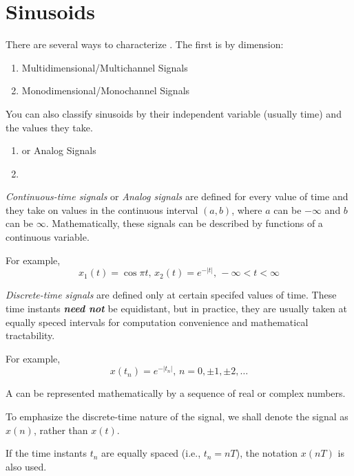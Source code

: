 \section{Sinusoids}\label{sec:Sinusoids}
There are several ways to characterize .
The first is by dimension:
\begin{enumerate}[noitemsep]
\item Multidimensional/Multichannel Signals
\item Monodimensional/Monochannel Signals
\end{enumerate}

You can also classify sinusoids by their independent variable (usually time) and the values they take.
\begin{enumerate}[noitemsep]
\item {} or Analog Signals
\item {}
\end{enumerate}

\begin{definition}\label{def:Continuous-Time Signals}
  \emph{Continuous-time signals} or \emph{Analog signals} are defined for every value of time and they take on values in the continuous interval $(a,b)$, where $a$ can be $-\infty$ and $b$ can be $\infty$.
  Mathematically, these signals can be described by functions of a continuous variable.

  For example,
  \begin{equation*}
    x_{1}(t) = \cos \pi t \text{, } x_{2}(t) = e^{-\lvert t \rvert} \text{, } -\infty < t < \infty
  \end{equation*}
\end{definition}

\begin{definition}\label{def:Discrete-Time Signals}
  \emph{Discrete-time signals} are defined only at certain specifed values of time.
  These time instants \textbf{\emph{need not}} be equidistant, but in practice, they are usually taken at equally speced intervals for computation convenience and mathematical tractability.

  For example,
  \begin{equation*}
    x(t_{n}) = e^{-\lvert t_{n} \rvert} \text{, } n=0, \pm 1, \pm 2, \ldots
  \end{equation*}

  A  can be represented mathematically by a sequence of real or complex numbers.
  \begin{remark}
    To emphasize the discrete-time nature of the signal, we shall denote the signal as $x(n)$, rather than $x(t)$.
  \end{remark}
  \begin{remark}
    If the time instants $t_{n}$ are equally spaced (i.e., $t_{n}=nT$), the notation $x(nT)$ is also used.
  \end{remark}
\end{definition}

